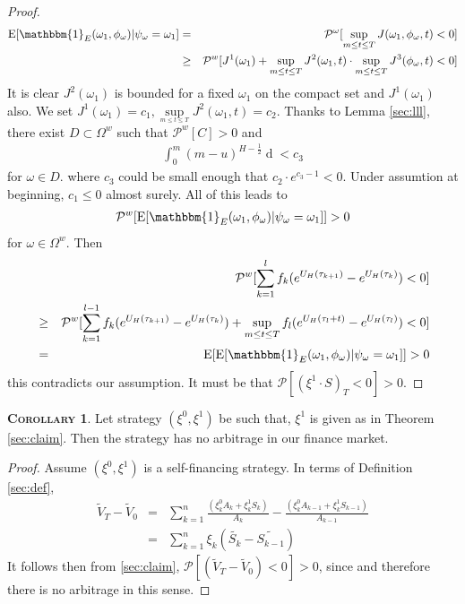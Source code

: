 \documentclass[a4paper, twoside, 11pt]{article}
\theoremstyle{definition}
\newtheorem{corollary}[definition]{\scshape Corollary}
\begin{document}
\begin{proof}
\begin{eqnarray*}
  \mathrm{E} [\mathbbm{1}_{E}(\omega_1, \phi_{\omega})| \psi_{\omega}=\omega_1] &=& \mathcal{P^{\omega}}[\sup\limits_{m\le t \le T} J(\omega_1, \phi_{\omega}, t) < 0] \\
  &\ge& \mathcal{P}^w[J^1(\omega_1) + \sup\limits_{m\le t \le T}J^2(\omega_1, t) \cdot \sup\limits_{m\le t \le T}J^3(\phi_{\omega}, t) < 0]
\end{eqnarray*}
It is clear $J^2(\omega_1)$ is bounded for a fixed $\omega_1$ on the compact set and $J^1(\omega_1)$ also. We set $J^1(\omega_1) = c_1 , \sup\limits_{_{m\le t \le T}}J^2(\omega_1, t) = c_2$. Thanks to Lemma \ref{sec:lll}, there exist $D \subset \Omega^{w} $  such that $\mathcal{P}^{w}[C] >0$ and 
\begin{eqnarray*}
  \int_0^{m}(m-u)^{H-\frac{1}{2}}\mathop{d \phi_{\omega}(u)} < c_3 
\end{eqnarray*}
for $\omega \in D$.
where $c_3$ could be small enough that $c_2 \cdot e^{c_3 - 1} < 0 $. Under assumtion at beginning, $c_1 \le 0$ almost surely. All of this leads to 
\begin{eqnarray*}
  \mathcal{P}^w[ \mathrm{E} [\mathbbm{1}_{E}(\omega_1, \phi_{\omega})| \psi_{\omega}=\omega_1]] > 0
\end{eqnarray*}
for $\omega \in \Omega^w$.
Then
\begin{eqnarray*}
  &&\mathcal{P}^w[\sum_{k=1}^{l} f_k (e^{U_H(\tau_{k+1})} - e^{U_H(\tau_k)}) < 0] \\
&\ge&\mathcal{P}^w[\sum_{k=1}^{l-1} f_k (e^{U_H(\tau_{k+1})}  - e^{U_H(\tau_{k})}) +  \sup\limits_{m\le t \le T}f_l(e^{U_H(\tau_l+t)}-e^{U_H(\tau_l)})  < 0]\\
&=& \mathrm{E}[ \mathrm{E} [\mathbbm{1}_{E}(\omega_1, \phi_{\omega})| \psi_{\omega}=\omega_1]] > 0
\end{eqnarray*}
this contradicts our assumption. It must be that ${\mathcal{P}}[(\xi^1 \cdot S)_T < 0] > 0$.
\end{proof}

\begin{corollary}
  Let strategy $(\xi^0, \xi^1)$ be such that, $\xi^1$ is given as in Theorem \ref{sec:claim}. Then the strategy has no arbitrage in our finance market.
\end{corollary}
\begin{proof}
  Assume $(\xi^0, \xi^1)$ is a self-financing strategy. In terms of Definition \ref{sec:def},
\begin{eqnarray*}
  \tilde{V}_T - \tilde{V}_0 &=&  \sum_{k=1} ^ n \frac{(\xi^0_kA_k + \xi^1_kS_k)}{A_k} - \frac{(\xi^0_{k}A_{k-1} + \xi^1_{k}S_{k-1})}{A_{k-1}}\\
  &=&  \sum_{k=1}^{n} \xi_k (\tilde{S_k} - \tilde{S_{k-1}})
\end{eqnarray*}
It follows then from \ref{sec:claim}, $\mathcal{P}[(\tilde{V}_T - \tilde{V}_0) < 0] > 0$, since and therefore there is no arbitrage in this sense.
\end{proof}
\end{document}
